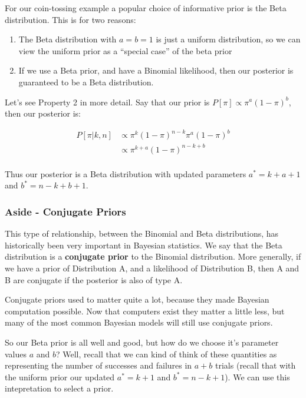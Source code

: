 \documentclass[
]{article}
\providecommand{\tightlist}{%
  \setlength{\itemsep}{0pt}\setlength{\parskip}{0pt}}
\begin{document}
For our coin-tossing example a popular choice of informative prior is
the Beta distribution. This is for two reasons:

\begin{enumerate}
\def\labelenumi{\arabic{enumi}.}
\tightlist
\item
  The Beta distribution with \(a=b=1\) is just a uniform distribution,
  so we can view the uniform prior as a ``special case'' of the beta
  prior
\item
  If we use a Beta prior, and have a Binomial likelihood, then our
  posterior is guaranteed to be a Beta distribution.
\end{enumerate}

Let's see Property 2 in more detail. Say that our prior is
\(P[\pi] \propto \pi^{a}(1-\pi)^{b}\), then our posterior is:

\[
\begin{split}
P[\pi|k,n] &\propto \pi^{k}(1-\pi)^{n-k} \pi^{a}(1-\pi)^{b}\\
&\propto \pi^{k+a}(1-\pi)^{n-k+b}\\
\end{split}
\]

Thus our posterior is a Beta distribution with updated parameters
\(a^*=k+a+1\) and \(b^* = n-k+b+1\).

\hypertarget{aside---conjugate-priors}{%
\subsubsection{Aside - Conjugate
Priors}\label{aside---conjugate-priors}}

This type of relationship, between the Binomial and Beta distributions,
has historically been very important in Bayesian statistics. We say that
the Beta distribution is a \textbf{conjugate prior} to the Binomial
distribution. More generally, if we have a prior of Distribution A, and
a likelihood of Distribution B, then A and B are conjugate if the
posterior is also of type A.

Conjugate priors used to matter quite a lot, because they made Bayesian
computation possible. Now that computers exist they matter a little
less, but many of the most common Bayesian models will still use
conjugate priors.

So our Beta prior is all well and good, but how do we choose it's
parameter values \(a\) and \(b\)? Well, recall that we can kind of think
of these quantities as representing the number of successes and failures
in \(a+b\) trials (recall that with the uniform prior our updated
\(a^*=k+1\) and \(b^*=n-k+1\)). We can use this intepretation to select
a prior.
\end{document}
